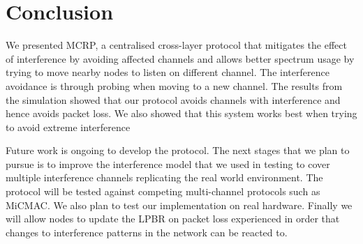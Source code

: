 \section{Conclusion}
\label{sec:conclusion}


We presented MCRP, a centralised cross-layer protocol that mitigates the effect of interference by avoiding affected channels and allows better spectrum usage by trying to move nearby nodes to listen on different channel. The interference avoidance is through probing when moving to a new channel. The results from the simulation showed that our protocol avoids channels with interference and hence avoids packet loss.  We also showed that this system works best when trying to avoid extreme interference

Future work is ongoing to develop the protocol. The next stages that we plan to pursue is to improve the interference model that we used in testing to cover multiple interference channels replicating the real world environment. The protocol will be tested against competing multi-channel protocols such as MiCMAC. We also plan to test our implementation on real hardware.  Finally we will allow nodes to update the LPBR on packet loss experienced in order that changes to interference patterns in the network can be reacted to.


